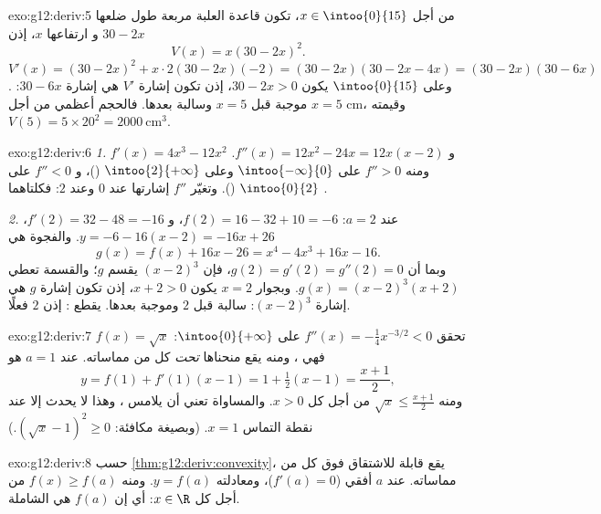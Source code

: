 \begin{solution}{exo:g12:deriv:5}
من أجل $x \in \intoo{0}{15}$، تكون قاعدة العلبة مربعة طول ضلعها $30 - 2x$ و
ارتفاعها $x$، إذن
\[
V(x) = x(30 - 2x)^2 .
\]
$V'(x) = (30-2x)^2 + x \cdot 2(30-2x)(-2) = (30-2x)(30 - 2x - 4x)
= (30-2x)(30-6x)$. وعلى $\intoo{0}{15}$ يكون $30 - 2x > 0$، إذن تكون إشارة $V'$ هي إشارة
$30 - 6x$: موجبة قبل $x = 5$ وسالبة بعدها. فالحجم أعظمي من أجل
$x = 5$ cm، وقيمته $V(5) = 5 \times 20^2 = 2000\ \text{cm}^3$.
\end{solution}

\begin{solution}{exo:g12:deriv:6}
\emph{1.} $f'(x) = 4x^3 - 12x^2$ و $f''(x) = 12x^2 - 24x = 12x(x-2)$.
ومنه $f'' > 0$ على $\intoo{-\infty}{0}$ وعلى $\intoo{2}{+\infty}$ ()،
و $f'' < 0$ على $\intoo{0}{2}$ (). وتغيّر $f''$ إشارتها عند $0$ وعند $2$:
فكلتاهما .

\emph{2.} عند $a = 2$: $f(2) = 16 - 32 + 10 = -6$، و $f'(2) = 32 - 48 = -16$،
 $y = -6 - 16(x-2) = -16x + 26$. والفجوة هي
\[
g(x) = f(x) + 16x - 26 = x^4 - 4x^3 + 16x - 16 .
\]
وبما أن $g(2) = g'(2) = g''(2) = 0$، فإن $(x-2)^3$ يقسم $g$؛ والقسمة تعطي
$g(x) = (x-2)^3(x+2)$. وبجوار $x = 2$ يكون $x + 2 > 0$، إذن تكون إشارة $g$ هي إشارة
$(x-2)^3$: سالبة قبل $2$ وموجبة بعدها.  يقطع
: إذن $2$  فعلًا.
\end{solution}

\begin{solution}{exo:g12:deriv:7}
 $f(x) = \sqrt{x}$ تحقق
$f''(x) = -\frac{1}{4}x^{-3/2} < 0$ على $\intoo{0}{+\infty}$: فهي ،
ومنه يقع منحناها \emph{تحت} كل  من مماساته.  عند $a = 1$ هو
\[
y = f(1) + f'(1)(x - 1) = 1 + \tfrac12 (x-1) = \frac{x+1}{2},
\]
ومنه $\sqrt{x} \leq \frac{x+1}{2}$ من أجل كل $x > 0$. والمساواة تعني أن
 يلامس ، وهذا لا يحدث إلا عند نقطة التماس
$x = 1$. (وبصيغة مكافئة: $\left(\sqrt x - 1\right)^2 \geq 0$.)
\end{solution}

\begin{solution}{exo:g12:deriv:8}
حسب \cref{thm:g12:deriv:convexity}، يقع    قابلة
للاشتقاق فوق كل  من مماساته.  عند $a$ أفقي
($f'(a) = 0$)، ومعادلته $y = f(a)$. ومنه $f(x) \geq f(a)$ من أجل كل
$x \in \R$: أي إن $f(a)$ هي  الشاملة.
\end{solution}


